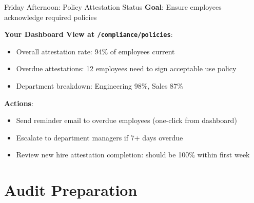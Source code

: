 \documentclass[aspectratio=169]{beamer}
\begin{document}
\begin{frame}{Friday Afternoon: Policy Attestation Status}
  \textbf{Goal}: Ensure employees acknowledge required policies
  
  \vspace{0.3cm}
  
  \textbf{Your Dashboard View at \texttt{/compliance/policies}}:
  \begin{itemize}
    \item Overall attestation rate: 94\% of employees current
    \item Overdue attestations: 12 employees need to sign acceptable use policy
    \item Department breakdown: Engineering 98\%, Sales 87\%
  \end{itemize}
  
  \vspace{0.3cm}
  
  \textbf{Actions}:
  \begin{itemize}
    \item Send reminder email to overdue employees (one-click from dashboard)
    \item Escalate to department managers if 7+ days overdue
    \item Review new hire attestation completion: should be 100\% within first week
  \end{itemize}
\end{frame}

\section{Audit Preparation}
\end{document}
